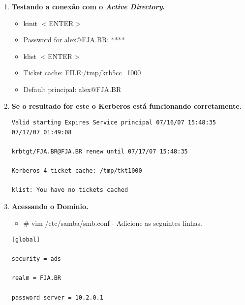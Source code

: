 \begin{enumerate}
\begin{lstlisting}
[realms]

FJA.BR = {

kdc = fjadc01.fja.br

default_domain = FJA.BR

kpasswd_server = fjadc01.fja.br

admin_server = fjadc01.fja.br

}

[domain_realm]

.fja.br = FJA.BR
\end{lstlisting}

	\item \textbf {Testando a conexão com o \textit{Active Directory}.}
		\begin{itemize}
			\item {kinit $<$ENTER$>$}
			\item {Password for alex$@$FJA.BR: ****}
			\item {klist $<$ENTER$>$}
			\item {Ticket cache: FILE:/tmp/krb5cc\_1000}
			\item {Default principal: alex$@$FJA.BR}
		\end{itemize}

	\item \textbf {Se o resultado for este o Kerberos está funcionando corretamente.}\\

		\begin{lstlisting}
Valid starting Expires Service principal 07/16/07 15:48:35  
07/17/07 01:49:08  

krbtgt/FJA.BR@FJA.BR renew until 07/17/07 15:48:35
	
Kerberos 4 ticket cache: /tmp/tkt1000
	
klist: You have no tickets cached
\end{lstlisting}

	\item \textbf{Acessando o Domínio.}
		\begin{itemize}
			\item {\# vim /etc/samba/smb.conf} -  Adicione as seguintes linhas.\\
		\end{itemize}

		\begin{lstlisting}
[global]

security = ads
		
realm = FJA.BR

password server = 10.2.0.1


\end{lstlisting}
\end{enumerate}
